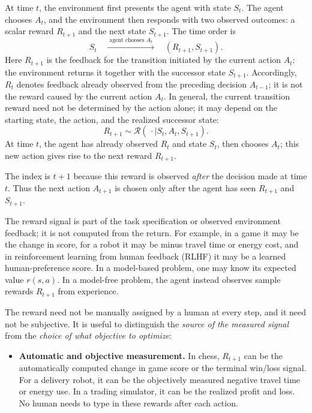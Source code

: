 \documentclass[11pt,a4paper]{article}
\theoremstyle{definition}
\begin{document}
\begin{note}
At time $t$, the environment first presents the agent with state $S_t$. The agent chooses
$A_t$, and the environment then responds with two observed outcomes: a scalar reward
$R_{t+1}$ and the next state $S_{t+1}$. The time order is
\[
S_t
\quad\xrightarrow{\;\text{agent chooses }A_t\;}\quad
(R_{t+1},S_{t+1}).
\]
Here $R_{t+1}$ is the feedback for the transition initiated by the current action $A_t$:
the environment returns it together with the successor state $S_{t+1}$. Accordingly,
$R_t$ denotes feedback already observed from the preceding decision $A_{t-1}$; it is not
the reward caused by the current action $A_t$. In general, the current transition reward
need not be determined by the action alone; it may depend on the starting state, the action,
and the realized successor state:
\[
R_{t+1}\sim\mathcal{R}(\,\cdot\mid S_t,A_t,S_{t+1}).
\]
At time $t$, the agent has already observed $R_t$ and state $S_t$, then chooses $A_t$; this
new action gives rise to the next reward $R_{t+1}$.

The index is $t+1$ because this reward is observed \emph{after} the decision made at time
$t$. Thus the next action $A_{t+1}$ is chosen only after the agent has seen $R_{t+1}$ and
$S_{t+1}$.

The reward signal is part of the task specification or observed environment feedback; it is
not computed from the return. For example, in a game it may be the change in score, for a
robot it may be minus travel time or energy cost, and in reinforcement learning from
human feedback (RLHF) it may be a learned
human-preference score. In a model-based problem, one may know its expected value
$r(s,a)$. In a model-free problem, the agent instead observes sample rewards
$R_{t+1}$ from experience.

The reward need not be manually assigned by a human at every step, and it need not be
subjective. It is useful to distinguish the \emph{source of the measured signal} from the
\emph{choice of what objective to optimize}:
\begin{itemize}
    \item \textbf{Automatic and objective measurement.} In chess, $R_{t+1}$ can be the
    automatically computed change in game score or the terminal win/loss signal. For a
    delivery robot, it can be the objectively measured negative travel time or energy use.
    In a trading simulator, it can be the realized profit and loss. No human needs to type
    in these rewards after each action.


\end{itemize}
\end{note}
\end{document}
